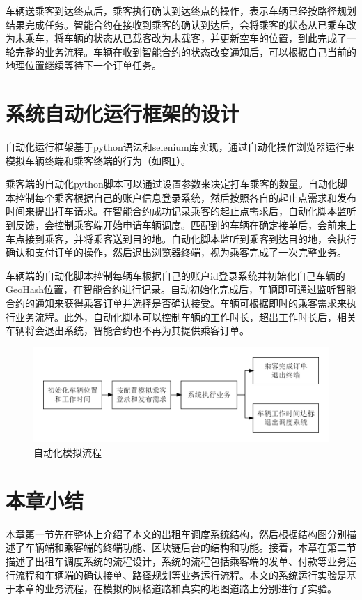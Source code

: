 车辆送乘客到达终点后，乘客执行确认到达终点的操作，表示车辆已经按路径规划结果完成任务。智能合约在接收到乘客的确认到达后，会将乘客的状态从已乘车改为未乘车，将车辆的状态从已载客改为未载客，并更新空车的位置，到此完成了一轮完整的业务流程。车辆在收到智能合约的状态改变通知后，可以根据自己当前的地理位置继续等待下一个订单任务。


\section{系统自动化运行框架的设计}
自动化运行框架基于python语法和selenium库实现，通过自动化操作浏览器运行来模拟车辆终端和乘客终端的行为（如图\ref{fig:auto}）。

乘客端的自动化python脚本可以通过设置参数来决定打车乘客的数量。自动化脚本控制每个乘客根据自己的账户信息登录系统，然后按照各自的起止点需求和发布时间来提出打车请求。在智能合约成功记录乘客的起止点需求后，自动化脚本监听到反馈，会控制乘客端开始申请车辆调度。匹配到的车辆在确定接单后，会前来上车点接到乘客，并将乘客送到目的地。自动化脚本监听到乘客到达目的地，会执行确认和支付订单的操作，然后退出浏览器终端，视为乘客完成了一次完整业务。

车辆端的自动化脚本控制每辆车根据自己的账户id登录系统并初始化自己车辆的GeoHash位置，在智能合约进行记录。自动初始化完成后，车辆即可通过监听智能合约的通知来获得乘客订单并选择是否确认接受。车辆可根据即时的乘客需求来执行业务流程。此外，自动化脚本可以控制车辆的工作时长，超出工作时长后，相关车辆将会退出系统，智能合约也不再为其提供乘客订单。
\begin{figure}[h]
  \centering
  \includegraphics[width=1.0\textwidth]{figures/自动化流程}
  \caption{自动化模拟流程}\label{fig:auto}
\end{figure}

\section{本章小结}
本章第一节先在整体上介绍了本文的出租车调度系统结构，然后根据结构图分别描述了车辆端和乘客端的终端功能、区块链后台的结构和功能。接着，本章在第二节描述了出租车调度系统的流程设计，系统的流程包括乘客端的发单、付款等业务运行流程和车辆端的确认接单、路径规划等业务运行流程。本文的系统运行实验是基于本章的业务流程，在模拟的网格道路和真实的地图道路上分别进行了实验。
